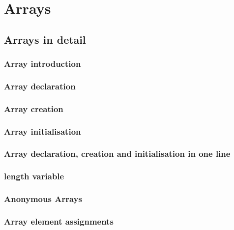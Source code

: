 \documentclass[14pt,fleqn]{extbook} %
\begin{document}

\chapter{Arrays}
\section{Arrays in detail}

\subsection{Array introduction}

\subsection{Array declaration}

\subsection{Array creation}

%
\subsection{Array initialisation}

\subsection{Array declaration, creation and initialisation in one line}

\subsection{length variable}

\subsection{Anonymous Arrays}

\subsection{Array element assignments}

\end{document}
